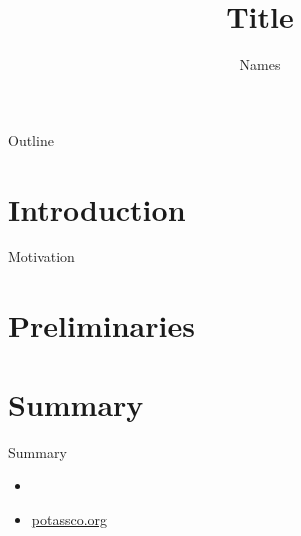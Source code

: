 \documentclass[t]{beamer}
\title{Title}
\author{Names}
\institute[KRR@UP]{University of Potsdam\\\bigskip\bigskip\texttt{[image: potassco\_logo\_lightblue]}}
\date{}
\begin{document}
\frame{\titlepage}
\begin{frame}{Outline}
  \bigskip
  \vfill
  \tableofcontents
\end{frame}
\section{Introduction}
\begin{frame}{Motivation}
\end{frame}
\section{Preliminaries}
\begin{frame}{}
\end{frame}
\section{Summary}
\begin{frame}{Summary}
  \begin{itemize}
  \item
  \item \url{potassco.org}
  \end{itemize}
\end{frame}
\end{document}
